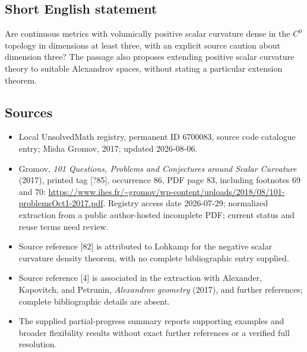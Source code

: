 \documentclass[11pt]{article}
\begin{document}
\subsection{Short English statement}
Are continuous metrics with volumically positive scalar curvature dense in the \(C^0\) topology in dimensions at least three, with an explicit source caution about dimension three? The passage also proposes extending positive scalar curvature theory to suitable Alexandrov spaces, without stating a particular extension theorem.
\subsection{Sources}
\begin{itemize}
\item Local UnsolvedMath registry, permanent ID 6700083, source code catalogue entry; Misha Gromov, 2017; updated 2026-08-06.
\item Gromov, \emph{101 Questions, Problems and Conjectures around Scalar Curvature} (2017), printed tag [?85], occurrence 86, PDF page 83, including footnotes 69 and 70: \url{https://www.ihes.fr/~gromov/wp-content/uploads/2018/08/101-problemsOct1-2017.pdf}. Registry access date 2026-07-29; normalized extraction from a public author-hosted incomplete PDF; current status and reuse terms need review.
\item Source reference [82] is attributed to Lohkamp for the negative scalar curvature density theorem, with no complete bibliographic entry supplied.
\item Source reference [4] is associated in the extraction with Alexander, Kapovitch, and Petrunin, \emph{Alexandrov geometry} (2017), and further references; complete bibliographic details are absent.
\item The supplied partial-progress summary reports supporting examples and broader flexibility results without exact further references or a verified full resolution.
\end{itemize}
\end{document}
